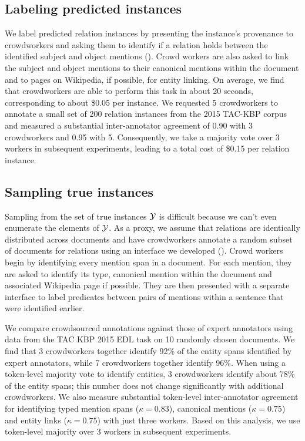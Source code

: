 \subsection{Labeling predicted instances}
We label predicted relation instances by presenting the instance's provenance to crowdworkers
  and asking them to identify if a relation holds between the identified subject and object mentions (). 
  Crowd workers are also asked to link the subject and object mentions to their canonical mentions within the document and to pages on Wikipedia, if possible, for entity linking.
On average, we find that crowdworkers are able to perform this task in about 20 seconds, corresponding to about \$0.05 per instance.
We requested 5 crowdworkers to annotate a small set of 200 relation instances from the 2015 TAC-KBP corpus 
and measured a substantial inter-annotator agreement of 0.90 with 3 crowdworkers and 0.95 with 5. %
Consequently, we take a majority vote over 3 workers in subsequent experiments,
leading to a total cost of \$0.15 per relation instance.

\subsection{Sampling true instances}
Sampling from the set of true instances $\mathcal{Y}$ is difficult because we can't even enumerate the elements of $\mathcal{Y}$.
As a proxy, we assume that relations are identically distributed across documents and have crowdworkers annotate a random subset of documents for relations using an interface we developed ().
Crowd workers begin by identifying every mention span in a document.
  For each mention, they are asked to identify its type, canonical mention within the document
  and associated Wikipedia page if possible.
They are then presented with a separate interface to label predicates between pairs of mentions within a sentence that were identified earlier.

We compare crowdsourced annotations against those of expert annotators using data from the TAC KBP 2015 EDL task on 10 randomly chosen documents.
We find that 3 crowdworkers together identify 92\% of the entity spans identified by expert annotators, while 7 crowdworkers together identify 96\%.
When using a token-level majority vote to identify entities, 3 crowdworkers identify about 78\% of the entity spans; this number does not change significantly with additional crowdworkers.
We also measure substantial token-level inter-annotator agreement for identifying typed mention spans ($\kappa = 0.83$), canonical mentions ($\kappa = 0.75$) and entity links ($\kappa = 0.75$) with just three workers.
Based on this analysis, we use token-level majority over 3 workers in subsequent experiments.

